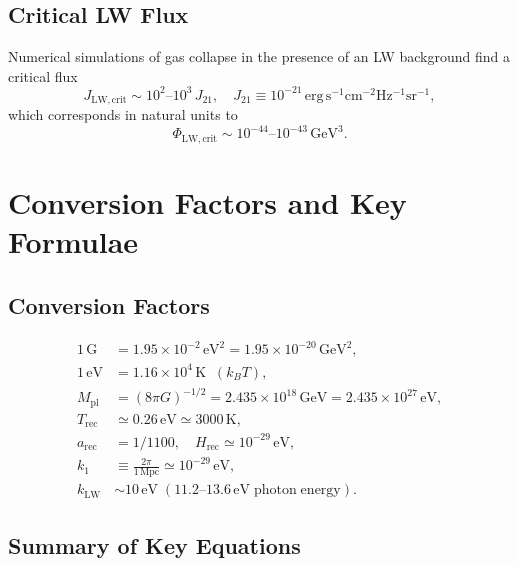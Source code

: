 \documentclass[12pt,a4paper]{report}
\newcommand{\Mpl}{M_{\mathrm{pl}}}
\newcommand{\Trec}{T_{\mathrm{rec}}}
\newcommand{\arec}{a_{\mathrm{rec}}}
\newcommand{\Hrec}{H_{\mathrm{rec}}}
\newcommand{\LW}{\mathrm{LW}}
\theoremstyle{definition}
\begin{document}
\section{Critical LW Flux}

Numerical simulations of gas collapse in the presence of an LW background find a
critical flux
\begin{equation}
  J_{\LW,\mathrm{crit}} \sim 10^2\text{--}10^3\,J_{21},
  \quad J_{21} \equiv 10^{-21}\,\mathrm{erg\,s^{-1}cm^{-2}Hz^{-1}sr^{-1}},
\end{equation}
which corresponds in natural units to
\begin{equation}
  \Phi_{\LW,\mathrm{crit}} \sim 10^{-44}\text{--}10^{-43}\,\mathrm{GeV}^3.
\end{equation}

\chapter{Conversion Factors and Key Formulae}
\label{app:conversions}

\section{Conversion Factors}

\begin{align}
  1\,\mathrm{G} &= 1.95\times10^{-2}\,\mathrm{eV}^2 = 1.95\times10^{-20}\,\mathrm{GeV}^2, \\
  1\,\mathrm{eV} &= 1.16\times10^4\,\mathrm{K} \;\;(k_B T), \\
  \Mpl &= (8\pi G)^{-1/2} = 2.435\times10^{18}\,\mathrm{GeV} = 2.435\times10^{27}\,\mathrm{eV}, \\
  \Trec &\simeq 0.26\,\mathrm{eV} \simeq 3000\,\mathrm{K}, \\
  \arec &= 1/1100, \quad
  \Hrec \simeq 10^{-29}\,\mathrm{eV}, \\
  k_1 &\equiv \frac{2\pi}{1\,\mathrm{Mpc}} \simeq 10^{-29}\,\mathrm{eV}, \\
  k_{\LW} &\sim 10\,\mathrm{eV} \; (11.2\text{--}13.6\,\mathrm{eV \; photon \; energy}).
\end{align}

\section{Summary of Key Equations}
\end{document}
